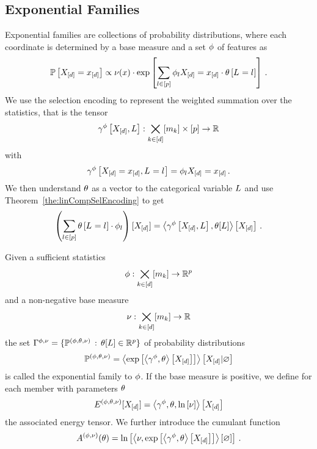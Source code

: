 \subsection{Exponential Families}\label{sec:exponentialFamilies}

Exponential families are collections of probability distributions, where each coordinate is determined by a base measure and a set $\phi$ of features as
	\[ \mathbb{P}\left[X_{[d]}=x_{[d]}\right]  \propto \nu(x) \cdot \mathrm{exp}\left[\sum_{l\in[p]} \phi_{l}{X_{[d]}=x_{[d]}} \cdot \theta\left[L_{}=l_{}\right]\right] \, . \]
We use the selection encoding to represent the weighted summation over the statistics, that is the tensor
	\[ \gamma^{\phi}\left[X_{[d]},L\right]: \bigtimes_{k\in[d]}[m_{k}] \times [p] \rightarrow \mathbb{R} \]
with
	\[ \gamma^{\phi}\left[X_{[d]}=x_{[d]},L_{}=l_{}\right] = \phi_{l}{X_{[d]}=x_{[d]}} \, . \]
We then understand $\theta$ as a vector to the categorical variable $L$ and use Theorem~\ref{the:linCompSelEncoding} to get
	\[ \left(\sum_{l\in[p]}\theta\left[L_{}=l_{}\right]\cdot \phi_{l} \right) [X_{[d]}] 
		 = \left\langle \gamma^{\phi}\left[X_{[d]},L\right] , \theta[L]\right\rangle \left[ X_{[d]} \right] \, . \]

\begin{definition}
	Given a sufficient statistics 
		\[ \phi : \bigtimes_{k\in[d]}[m_{k}] \rightarrow \mathbb{R}^p\]
	and a non-negative base measure
		\[ \nu : \bigtimes_{k\in[d]}[m_{k}] \rightarrow \mathbb{R} \]
	the set $\Gamma^{\phi,\nu}=\{\mathbb{P}^{(\phi,\theta,\nu)} \, : \, \theta[L] \in \mathbb{R}^{p}\}$ of probability distributions 
		\[ \mathbb{P}^{(\phi,\theta,\nu)} = \left\langle \mathrm{exp}\left[\left\langle \gamma^{\phi},\theta\right\rangle \left[ X_{[d]} \right]\right]\right\rangle \left[ X_{[d]} | \varnothing \right] \]
	is called the exponential family to $\phi$.
	If the base measure is positive, we define for each member with parameters $\theta$
		\[ E^{(\phi,\theta,\nu)}[X_{[d]}] = \left\langle \gamma^{\phi},\theta,\ln \left[ \nu \right]\right\rangle \left[ X_{[d]} \right] \]
	the associated energy tensor.
	We further introduce the cumulant function
		\[ A^{(\phi,\nu)}(\theta) = \ln \left[ \left\langle \nu,\mathrm{exp}\left[\left\langle \gamma^{\phi},\theta\right\rangle \left[ X_{[d]} \right] \right]\right\rangle \left[ \varnothing \right]  \right] \, .\]
\end{definition}


